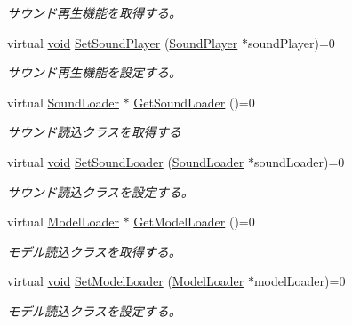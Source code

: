 \begin{DoxyCompactItemize}
\begin{DoxyCompactList}\small\item\em サウンド再生機能を取得する。 \end{DoxyCompactList}\item 
virtual \mbox{\hyperlink{namespace_effekseer_ab34c4088e512200cf4c2716f168deb56}{void}} \mbox{\hyperlink{class_effekseer_1_1_manager_af08602f559cd1f75bcaacfd8b1ec0840}{Set\+Sound\+Player}} (\mbox{\hyperlink{class_effekseer_1_1_sound_player}{Sound\+Player}} $\ast$sound\+Player)=0
\begin{DoxyCompactList}\small\item\em サウンド再生機能を設定する。 \end{DoxyCompactList}\item 
virtual \mbox{\hyperlink{class_effekseer_1_1_sound_loader}{Sound\+Loader}} $\ast$ \mbox{\hyperlink{class_effekseer_1_1_manager_a9d6e1710083866bf1fc8953f340df002}{Get\+Sound\+Loader}} ()=0
\begin{DoxyCompactList}\small\item\em サウンド読込クラスを取得する \end{DoxyCompactList}\item 
virtual \mbox{\hyperlink{namespace_effekseer_ab34c4088e512200cf4c2716f168deb56}{void}} \mbox{\hyperlink{class_effekseer_1_1_manager_afc9015a7a866accf73ab3b295bff8e06}{Set\+Sound\+Loader}} (\mbox{\hyperlink{class_effekseer_1_1_sound_loader}{Sound\+Loader}} $\ast$sound\+Loader)=0
\begin{DoxyCompactList}\small\item\em サウンド読込クラスを設定する。 \end{DoxyCompactList}\item 
virtual \mbox{\hyperlink{class_effekseer_1_1_model_loader}{Model\+Loader}} $\ast$ \mbox{\hyperlink{class_effekseer_1_1_manager_a6afd86fbdfb8b3e6d12c9a80bfb3f80e}{Get\+Model\+Loader}} ()=0
\begin{DoxyCompactList}\small\item\em モデル読込クラスを取得する。 \end{DoxyCompactList}\item 
virtual \mbox{\hyperlink{namespace_effekseer_ab34c4088e512200cf4c2716f168deb56}{void}} \mbox{\hyperlink{class_effekseer_1_1_manager_a994104b9b353a09861d27ec87b09fa1c}{Set\+Model\+Loader}} (\mbox{\hyperlink{class_effekseer_1_1_model_loader}{Model\+Loader}} $\ast$model\+Loader)=0
\begin{DoxyCompactList}\small\item\em モデル読込クラスを設定する。 \end{DoxyCompactList}\item 

\end{DoxyCompactItemize}
